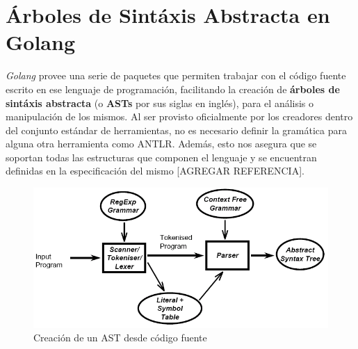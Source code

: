 \section{Árboles de Sintáxis Abstracta en Golang}
\textit{Golang} provee una serie de paquetes que permiten trabajar con el código fuente escrito en ese 
lenguaje de programación, facilitando la creación de \textbf{árboles de sintáxis abstracta}
(o \textbf{ASTs} por sus siglas en inglés), para el análisis o manipulación de los mismos.
Al ser provisto oficialmente por los creadores dentro del conjunto estándar de herramientas, 
no es necesario definir la gramática para alguna otra herramienta como ANTLR.
Además, esto nos asegura que se soportan todas las estructuras que componen el lenguaje 
y se encuentran definidas en la especificación del mismo [AGREGAR REFERENCIA].

\begin{figure}[H]
  \includegraphics[width=12cm]{implementation/parsingpipeline}
  \centering
  \caption{Creación de un AST desde código fuente}
\end{figure}

